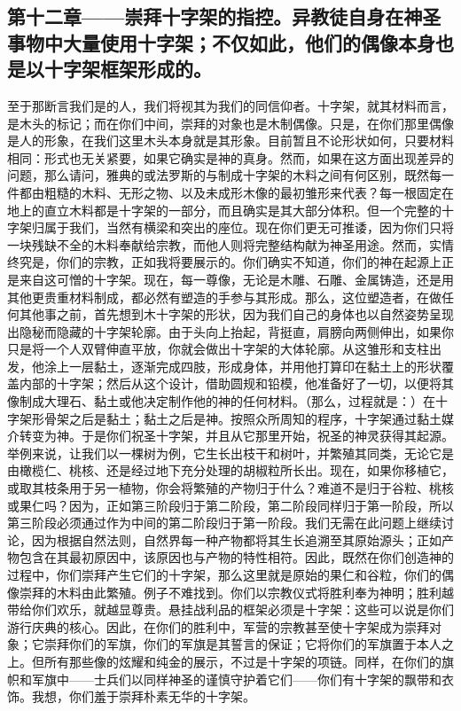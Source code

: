 
\subsection{第十二章——崇拜十字架的指控。异教徒自身在神圣事物中大量使用十字架；不仅如此，他们的偶像本身也是以十字架框架形成的。}

至于那断言我们是的人，我们将视其为我们的同信仰者。十字架，就其材料而言，是木头的标记；而在你们中间，崇拜的对象也是木制偶像。只是，在你们那里偶像是人的形象，在我们这里木头本身就是其形象。目前暂且不论形状如何，只要材料相同：形式也无关紧要，如果它确实是神的真身。然而，如果在这方面出现差异的问题，那么请问，雅典的或法罗斯的与制成十字架的木料之间有何区别，既然每一件都由粗糙的木料、无形之物、以及未成形木像的最初雏形来代表？每一根固定在地上的直立木料都是十字架的一部分，而且确实是其大部分体积。但一个完整的十字架归属于我们，当然有横梁和突出的座位。现在你们更无可推诿，因为你们只将一块残缺不全的木料奉献给宗教，而他人则将完整结构献为神圣用途。然而，实情终究是，你们的宗教，正如我将要展示的。你们确实不知道，你们的神在起源上正是来自这可憎的十字架。现在，每一尊像，无论是木雕、石雕、金属铸造，还是用其他更贵重材料制成，都必然有塑造的手参与其形成。那么，这位塑造者，在做任何其他事之前，首先想到木十字架的形状，因为我们自己的身体也以自然姿势呈现出隐秘而隐藏的十字架轮廓。由于头向上抬起，背挺直，肩膀向两侧伸出，如果你只是将一个人双臂伸直平放，你就会做出十字架的大体轮廓。从这雏形和支柱出发，他涂上一层黏土，逐渐完成四肢，形成身体，并用他打算印在黏土上的形状覆盖内部的十字架；然后从这个设计，借助圆规和铅模，他准备好了一切，以便将其像制成大理石、黏土或他决定制作他的神的任何材料。（那么，过程就是：）在十字架形骨架之后是黏土；黏土之后是神。按照众所周知的程序，十字架通过黏土媒介转变为神。于是你们祝圣十字架，并且从它那里开始，祝圣的神灵获得其起源。举例来说，让我们以一棵树为例，它生长出枝干和树叶，并繁殖其同类，无论它是由橄榄仁、桃核、还是经过地下充分处理的胡椒粒所长出。现在，如果你移植它，或取其枝条用于另一植物，你会将繁殖的产物归于什么？难道不是归于谷粒、桃核或果仁吗？因为，正如第三阶段归于第二阶段，第二阶段同样归于第一阶段，所以第三阶段必须通过作为中间的第二阶段归于第一阶段。我们无需在此问题上继续讨论，因为根据自然法则，自然界每一种产物都将其生长追溯至其原始源头；正如产物包含在其最初原因中，该原因也与产物的特性相符。因此，既然在你们创造神的过程中，你们崇拜产生它们的十字架，那么这里就是原始的果仁和谷粒，你们的偶像崇拜的木料由此繁殖。例子不难找到。你们以宗教仪式将胜利奉为神明；胜利越带给你们欢乐，就越显尊贵。悬挂战利品的框架必须是十字架：这些可以说是你们游行庆典的核心。因此，在你们的胜利中，军营的宗教甚至使十字架成为崇拜对象；它崇拜你们的军旗，你们的军旗是其誓言的保证；它将你们的军旗置于本人之上。但所有那些像的炫耀和纯金的展示，不过是十字架的项链。同样，在你们的旗帜和军旗中——士兵们以同样神圣的谨慎守护着它们——你们有十字架的飘带和衣饰。我想，你们羞于崇拜朴素无华的十字架。\par


